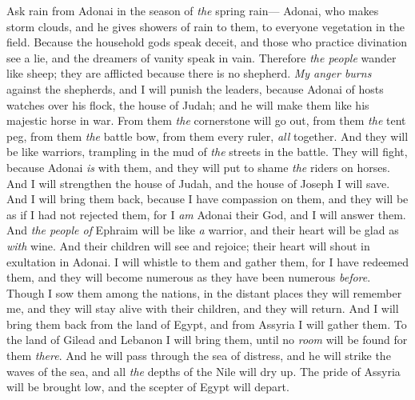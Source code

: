 \begin{biblechapter} %
 Ask rain from Adonai in the season of \textit{the} spring rain—
\verse Adonai, who makes storm clouds, 
and he gives showers of rain to them, 
to everyone vegetation in the field.
\verse Because the household gods speak deceit, 
and those who practice divination see a lie, 
and the dreamers of vanity speak in vain. 
Therefore \textit{the people} wander like sheep; 
they are afflicted because there is no shepherd.
\verse \textit{My anger burns} against the shepherds, 
and I will punish the leaders, 
because Adonai of hosts watches over his flock, 
the house of Judah; 
and he will make them like his majestic horse in war.
\verse From them \textit{the} cornerstone will go out, 
from them \textit{the} tent peg, 
from them \textit{the} battle bow, 
from them every ruler, 
\textit{all} together.
\verse And they will be like warriors, 
trampling in the mud of \textit{the} streets in the battle. 
They will fight, because Adonai \textit{is} with them, 
and they will put to shame \textit{the} riders on horses.
\verse And I will strengthen the house of Judah, 
and the house of Joseph I will save. 
And I will bring them back, because I have compassion on them, 
and they will be as if I had not rejected them, 
for I \textit{am} Adonai their God, and I will answer them.
\verse And \textit{the people of} Ephraim will be like \textit{a} warrior, 
and their heart will be glad as \textit{with} wine. 
And their children will see and rejoice; 
their heart will shout in exultation in Adonai.
\verse I will whistle to them and gather them, 
for I have redeemed them, 
and they will become numerous as they have been numerous \textit{before}.
\verse Though I sow them among the nations, 
in the distant places they will remember me, 
and they will stay alive with their children, and they will return.
\verse And I will bring them back from the land of Egypt, 
and from Assyria I will gather them. 
To the land of Gilead and Lebanon I will bring them, 
until no \textit{room} will be found for them \textit{there}.
\verse And he will pass through the sea of distress, 
and he will strike the waves of the sea, 
and all \textit{the} depths of the Nile will dry up. 
The pride of Assyria will be brought low, 
and the scepter of Egypt will depart.
\end{biblechapter}

